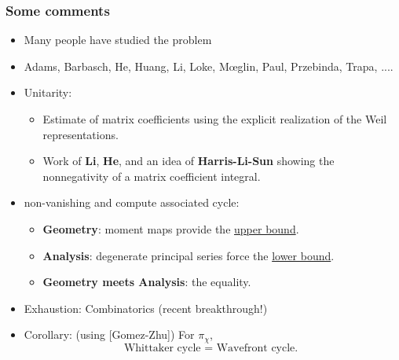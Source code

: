 \documentclass[t,mathserif,11pt,usenames,dvipsnames]{beamer}
\theoremstyle{plain}
\theoremstyle{definition}
\def\red{\color{red}}
\def\lblue{\color{blue}}
\begin{document}
    
    \begin{frame}[label=CG]
        \frametitle{Some comments}
        \begin{itemize}[<+->]
            \item Many people have studied the problem
            \item[] Adams, Barbasch,  He, Huang, Li, Loke, M\oe glin, Paul, Przebinda, Trapa,  ....
            \item {\lblue Unitarity}:
            \begin{itemize}
                \item Estimate of matrix coefficients using the explicit realization of the
                Weil representations.
                \item[] Work of {\bf Li}, {\bf He}, and an idea of {\bf Harris-Li-Sun} showing
                the {\lblue nonnegativity} of a matrix coefficient integral.
            \end{itemize}
            \item {\lblue non-vanishing} and compute {\lblue associated cycle}:
            \begin{itemize}
                \item {\bf Geometry}: moment maps provide the \underline{upper bound}.
                \item {\bf Analysis}: degenerate principal series force the \underline{lower
                bound}.
                \item {\bf Geometry meets Analysis}: the equality.
            \end{itemize}
            \item {\lblue Exhaustion:} Combinatorics  {\red (recent breakthrough!)} 
            \item {\lblue Corollary:} (using [Gomez-Zhu]) For $\pi_\chi$, 
           \[
            \text{Whittaker cycle   = Wavefront cycle. }
           \] 
            
        \end{itemize}
    \end{frame}
    
\end{document}
